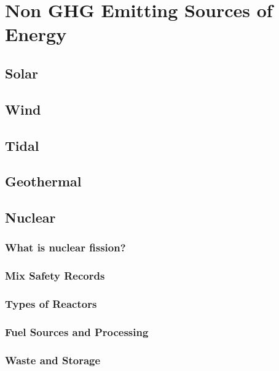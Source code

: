\chapter{Non GHG Emitting Sources of Energy}\label{ch:non_GHG}

\section{Solar}

\section{Wind}

\section{Tidal}


\section{Geothermal}



\section{Nuclear}

\subsection{What is nuclear fission?}

\subsection{Mix Safety Records}

\subsection{Types of Reactors}

\subsection{Fuel Sources and Processing}

\subsection{Waste and Storage}



